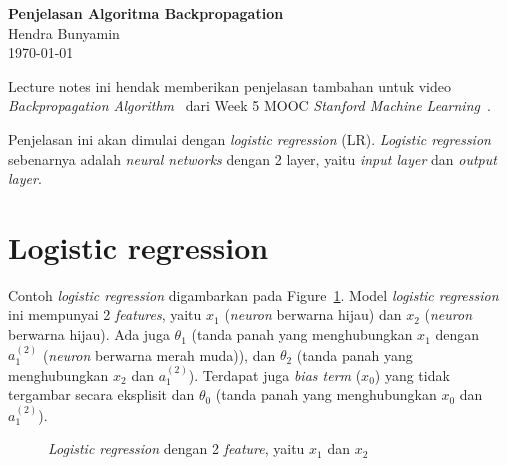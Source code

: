 \documentclass[12pt]{article}
\begin{document}
\begin{center}
  \Large \textbf{Penjelasan Algoritma Backpropagation} \\
  \vspace{0.1in}
  \normalsize Hendra Bunyamin \\
  \today
\end{center}

Lecture notes ini hendak memberikan penjelasan tambahan untuk video \textit{Backpropagation Algorithm}~\citep{ng2020backpropalgo} dari Week 5 MOOC {\textit{Stanford Machine Learning}}~\citep{ng2020week5}. 

Penjelasan ini akan dimulai dengan \textit{logistic regression} (LR). \textit{Logistic regression} sebenarnya adalah \textit{neural networks} dengan 2 layer, yaitu \textit{input layer} dan \textit{output layer}. 

\section*{Logistic regression}
Contoh \textit{logistic regression} digambarkan pada Figure~\ref{fig:LR}. Model \textit{logistic regression} ini mempunyai 2 \textit{features}, yaitu $x_1$ (\textit{neuron} berwarna hijau) dan $x_2$ (\textit{neuron} berwarna hijau). Ada juga $\theta_1$ (tanda panah yang menghubungkan $x_1$ dengan $a^{(2)}_1$ (\textit{neuron} berwarna merah muda)), dan $\theta_2$ (tanda panah yang menghubungkan $x_2$ dan $a^{(2)}_1$). Terdapat juga \textit{bias term} ($x_0$) yang tidak tergambar secara eksplisit dan $\theta_0$ (tanda panah yang menghubungkan $x_0$ dan $a^{(2)}_1$).

\def\layersep{2.5cm}
\begin{figure}[!ht]
	\centering
{}	
\caption{\textit{Logistic regression} dengan 2 \textit{feature}, yaitu $x_1$ dan $x_2$}
\label{fig:LR}
\end{figure}
\end{document}
